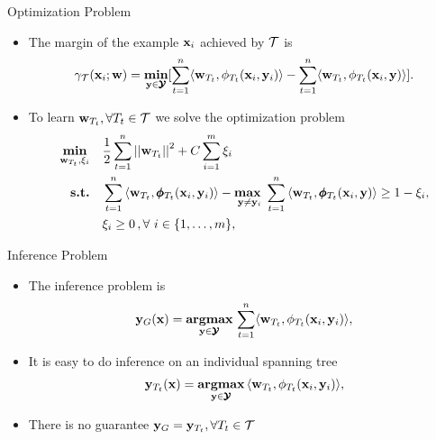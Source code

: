 \documentclass[first=dgreen,second=purple,logo=yellowexc]{aaltoslides}
\begin{document}
%
\begin{frame}{Optimization Problem}
	\begin{itemize}
		\item The margin of the example $\mathbf {x}_i$ achieved by $\mathcal{T}$ is
		\begin{align*}
		\gamma_{\mathcal{T}}(\mathbf {x}_i;\mathbf {w}) = \underset{\mathbf {y}\in\pmb {\mathcal{Y}}}{\textbf{min}}[\sum_{t=1}^{n}\langle \mathbf {w}_{T_t}, \phi_{T_t}(\mathbf {x}_i,\mathbf {y}_i) \rangle-\sum_{t=1}^{n}\langle \mathbf {w}_{T_t}, \phi_{T_t}(\mathbf {x}_i,\mathbf {y}) \rangle].
	\end{align*}
		\item To learn $\mathbf {w}_{T_t},\forall T_t\in\mathcal{T}$ we solve the optimization problem
		\begin{align*}
			\underset{\vw_{T_t},\xi_i}{\minimize} & \quad \frac{1}{2}\sum_{t=1}^{n}\norm{\vw_{T_t}}^2 + C\sum_{i=1}^{m}\xi_i\\
			\st & \quad \sum_{t=1}^{n}{ \langle \vw_{T_t}, \phib_{T_t}(\vx_i,\vy_i) \rangle} - \underset{\vy \neq \vy_i}{\maximize\ } \sum_{t=1}^{n}{\langle \vw_{T_t}, \phib_{T_t}(\vx_i,\vy) \rangle } \geq 1 -  \xi_i, \\
			& \quad \xi_i\ge0\, , \forall\ i \in \set{1,\dots,m},
		\end{align*}
	\end{itemize}
\end{frame}



%
\begin{frame}{Inference Problem}
	\begin{itemize}
		\item The inference problem is
		\begin{align*}
			\mathbf {y}_{G}(\mathbf {x}) = \underset{\mathbf {y}\in\pmb {\mathcal{Y}}}{\textbf{argmax}}\,\sum_{t=1}^{n}\langle \mathbf {w}_{T_t}, \phi_{T_t}(\mathbf {x}_i,\mathbf {y}_i) \rangle,
		\end{align*}
		\item It is easy to do inference on an individual spanning tree
		\begin{align*}
			\mathbf {y}_{T_t}(\mathbf {x}) = \underset{\mathbf {y}\in\pmb {\mathcal{Y}}}{\textbf{argmax}}\,\langle \mathbf {w}_{T_t}, \phi_{T_t}(\mathbf {x}_i,\mathbf {y}_i) \rangle,
		\end{align*}
		\item There is no guarantee $\mathbf {y}_{G}=\mathbf {y}_{T_t},\forall T_t\in\mathcal{T}$
	\end{itemize}
\end{frame}
\end{document}
